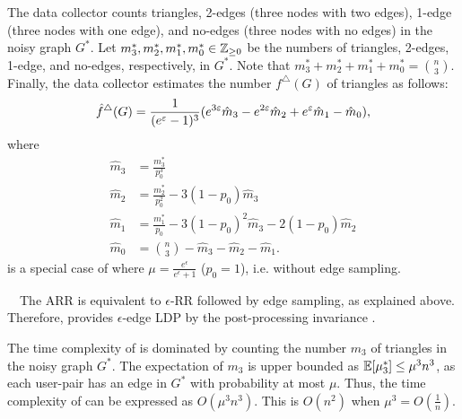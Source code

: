 The data collector counts triangles, 2-edges (three nodes with two edges), 1-edge (three nodes with one edge), and no-edges (three nodes with no edges) in the noisy graph $G^*$.
Let $m_3^*, m_2^*, m_1^*, m_0^* \in \mathbb{Z}_{\ge0}$ be the numbers of triangles, 2-edges, 1-edge, and no-edges, respectively, in $G^*$.
Note that $m_3^* + m_2^* + m_1^* + m_0^* = \binom{n}{3}$.
Finally, the data collector estimates the number $f^\triangle(G)$ of triangles as follows:
\begin{align}
    \hat{f}^\triangle(G) = \frac{1}{(e^\varepsilon-1)^3}(e^{3\varepsilon} \hat{m}_3 - e^{2\varepsilon} \hat{m}_2 + e^\varepsilon \hat{m}_1 - \hat{m}_0),
    \label{eq:ARR_hf}
\end{align}
where
\begin{align}
\hat{m}_3 &= \textstyle{\frac{m_3^*}{p_0^3}} \label{eq:ARR_m3}\\
\hat{m}_2 &= \textstyle{\frac{m_2^*}{p_0^2} - 3(1-p_0)\hat{m}_3} \label{eq:ARR_m2}\\
\hat{m}_1 &= \textstyle{\frac{m_1^*}{p_0} - 3(1-p_0)^2\hat{m}_3 - 2(1-p_0)\hat{m}_2} \label{eq:ARR_m1}\\
\hat{m}_0 &= \textstyle{\binom{n}{3} - \hat{m}_3 - \hat{m}_2 - \hat{m}_1}. \label{eq:ARR_m0}
\end{align}
\AlgRRTri{} is a special case of \AlgARRTri{} where $\mu = \frac{e^\epsilon}{e^\epsilon + 1}$ ($p_0 = 1$), i.e. without edge sampling.

\smallskip
{}~~The ARR is equivalent to $\epsilon$-RR followed by edge sampling, as explained above.
Therefore, \AlgARRTri{} provides $\epsilon$-edge LDP by the post-processing invariance \cite{DP}.

The time complexity of \AlgARRTri{} is dominated by counting the number $m_3$ of triangles in the noisy graph $G^*$.
The expectation of $m_3$ is upper bounded as $\operatorname{\mathbb{E}}[\mu_3^*] \leq \mu^3 n^3$, as each user-pair has an edge in $G^*$ with probability at most $\mu$.
Thus, the time complexity of \AlgARRTri{} can be expressed as $O(\mu^3 n^3)$.
This is $O(n^2)$ when $\mu^3 = O(\frac{1}{n})$.

